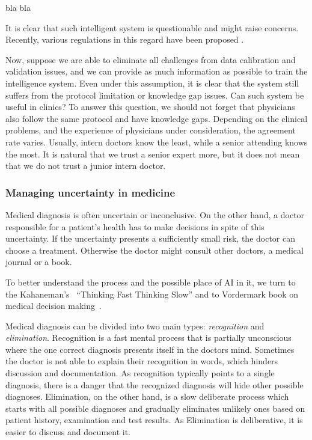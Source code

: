 \documentclass[11pt]{pnas-new}
\begin{document}
\newpage
bla bla




   
It is clear that such intelligent system is questionable and might
raise concerns. Recently, various regulations in this regard have been
proposed \cite{price2014black,ford2016privacy}.


Now, suppose we are able to eliminate all challenges from data
calibration and validation issues, and we can provide as much
information as possible to train the intelligence system. Even under
this assumption, it is clear that the system still suffers from the
protocol limitation or knowledge gap issues. Can such system be useful
in clinics? To answer this question, we should not forget that
physicians also follow the same protocol and have knowledge
gaps. Depending on the clinical problems, and the experience of
physicians under consideration, the agreement rate varies. Usually,
intern doctors know the least, while a senior attending knows the
most. It is natural that we trust a senior expert more, but it does
not mean that we do not trust a junior intern doctor.

\subsubsection*{Managing uncertainty in medicine}
Medical diagnosis is often uncertain or inconclusive. On the other
hand, a doctor responsible for a patient's health has to make
decisions in spite of this uncertainty. If the uncertainty presents a
sufficiently small risk, the doctor can choose a treatment. Otherwise
the doctor might consult other doctors, a medical journal or a book. 

To better understand the process and the possible place of AI in it,
we turn to the Kahaneman's~\cite{kahneman2011thinking} ``Thinking Fast Thinking Slow'' and
to Vordermark book on medical decision
making~\cite{vordermark2019introduction}.

Medical diagnosis can be divided into two main types: {\em
  recognition} and {\em elimination}. Recognition is a fast mental
process that is partially unconscious where the one correct diagnosis presents itself in the doctors mind.  Sometimes the doctor is not able to explain their recognition in words, which hinders discussion and documentation.  As recognition 
typically points to a single diagnosis, there is a danger that the
recognized diagnosis will hide other possible diagnoses.
Elimination, on the other hand, is a slow deliberate process  which starts with all possible diagnoses and gradually eliminates
unlikely ones based on patient history, examination and test
results. As Elimination is deliberative, it is easier to discuss and
document it.
\end{document}
